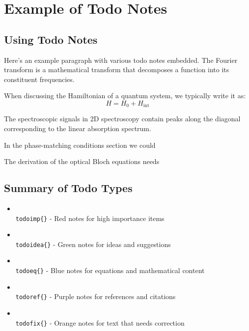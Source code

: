 \chapter{Example of Todo Notes}

\section{Using Todo Notes}

\noindent Here's an example paragraph with various todo notes embedded. The Fourier transform is a mathematical transform that decomposes a function into its constituent frequencies. 

\noindent When discussing the Hamiltonian of a quantum system, we typically write it as:
\begin{equation}
    H = H_0 + H_{\text{int}}
\end{equation}


\noindent The spectroscopic signals in 2D spectroscopy contain peaks along the diagonal corresponding to the linear absorption spectrum. 

\noindent In the phase-matching conditions section we could 

\noindent The derivation of the optical Bloch equations needs 

\section{Summary of Todo Types}

\begin{itemize}
    \item \texttt{\\todoimp\{\}} - Red notes for high importance items
    \item \texttt{\\todoidea\{\}} - Green notes for ideas and suggestions
    \item \texttt{\\todoeq\{\}} - Blue notes for equations and mathematical content
    \item \texttt{\\todoref\{\}} - Purple notes for references and citations
    \item \texttt{\\todofix\{\}} - Orange notes for text that needs correction
\end{itemize}

